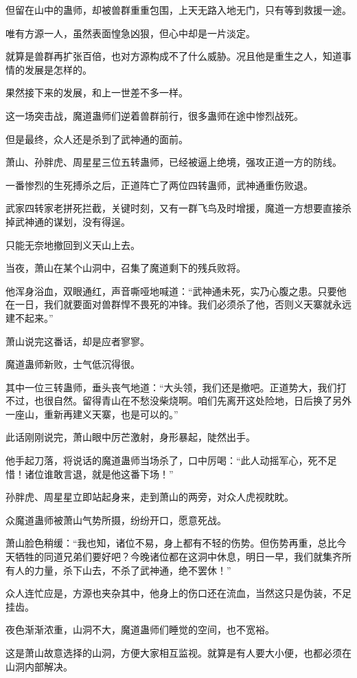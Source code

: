 \begin{this_body}
但留在山中的蛊师，却被兽群重重包围，上天无路入地无门，只有等到救援一途。

唯有方源一人，虽然表面惶急凶狠，但心中却是一片淡定。

就算是兽群再扩张百倍，也对方源构成不了什么威胁。况且他是重生之人，知道事情的发展是怎样的。

果然接下来的发展，和上一世差不多一样。

这一场突击战，魔道蛊师们逆着兽群前行，很多蛊师在途中惨烈战死。

但是最终，众人还是杀到了武神通的面前。

萧山、孙胖虎、周星星三位五转蛊师，已经被逼上绝境，强攻正道一方的防线。

一番惨烈的生死搏杀之后，正道阵亡了两位四转蛊师，武神通重伤败退。

武家四转家老拼死拦截，关键时刻，又有一群飞鸟及时增援，魔道一方想要直接杀掉武神通的谋划，没有得逞。

只能无奈地撤回到义天山上去。

当夜，萧山在某个山洞中，召集了魔道剩下的残兵败将。

他浑身浴血，双眼通红，声音嘶哑地喊道：“武神通未死，实乃心腹之患。只要他在一日，我们就要面对兽群悍不畏死的冲锋。我们必须杀了他，否则义天寨就永远建不起来。”

萧山说完这番话，却是应者寥寥。

魔道蛊师新败，士气低沉得很。

其中一位三转蛊师，垂头丧气地道：“大头领，我们还是撤吧。正道势大，我们打不过，也很自然。留得青山在不愁没柴烧啊。咱们先离开这处险地，日后换了另外一座山，重新再建义天寨，也是可以的。”

此话刚刚说完，萧山眼中厉芒激射，身形暴起，陡然出手。

他手起刀落，将说话的魔道蛊师当场杀了，口中厉喝：“此人动摇军心，死不足惜！诸位谁敢言退，就是他这番下场！”

孙胖虎、周星星立即站起身来，走到萧山的两旁，对众人虎视眈眈。

众魔道蛊师被萧山气势所摄，纷纷开口，愿意死战。

萧山脸色稍缓：“我也知，诸位不易，身上都有不轻的伤势。但伤势再重，总比今天牺牲的同道兄弟们要好吧？今晚诸位都在这洞中休息，明日一早，我们就集齐所有人的力量，杀下山去，不杀了武神通，绝不罢休！”

众人连忙应是，方源也夹杂其中，他身上的伤口还在流血，当然这只是伪装，不足挂齿。

夜色渐渐浓重，山洞不大，魔道蛊师们睡觉的空间，也不宽裕。

这是萧山故意选择的山洞，方便大家相互监视。就算是有人要大小便，也都必须在山洞内部解决。


\end{this_body}
